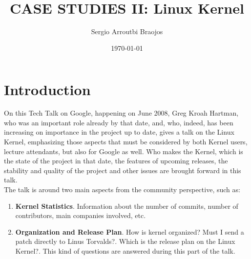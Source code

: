 \documentclass[11pt]{article}
\title{\textbf{CASE STUDIES II: Linux Kernel}}
\author{Sergio Arroutbi Braojos}
\date{\today}
\begin{document}
\maketitle

\section{Introduction}
On this Tech Talk on Google, happening on June 2008, Greg Kroah Hartman, who was an important role already by that date, and, who, indeed, has been increasing on importance in the project up to date, gives a talk on the Linux Kernel, emphasizing those aspects that must be considered by both Kernel users, lecture attendants, but also for Google as well. Who makes the Kernel, which is the state of the project in that date, the features of upcoming releases, the stability and quality of the project and other issues are brought forward in this talk.\\
The talk is around two main aspects from the community perspective, such as:
\begin{enumerate}
\item{\textbf{Kernel Statistics}}. Information about the number of commits, number of contributors, main companies involved, etc. 
\item{\textbf{Organization and Release Plan}}. How is kernel organized? Must I send a patch directly to Linus Torvalds?. Which is the release plan on the Linux Kernel?. This kind of questions are answered during this part of the talk.
\end{enumerate}
\end{document}

